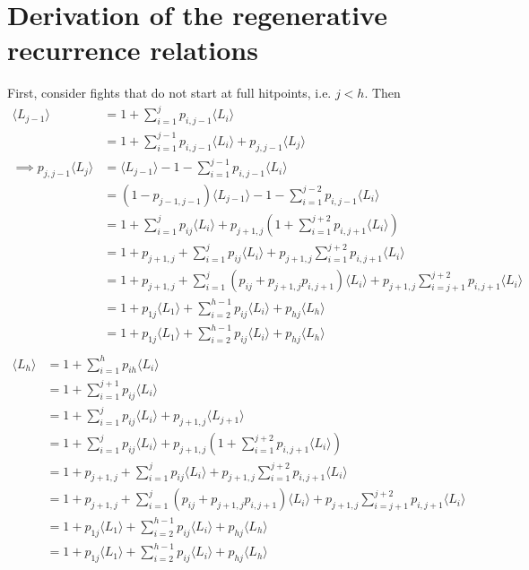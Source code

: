 \section{Derivation of the regenerative recurrence relations}\label{sect:regenRecurrenceDerivation}
First, consider fights that do not start at full hitpoints, i.e. $j < h$. Then
\begin{align}
	\langle L_{j-1} \rangle
		&= 1 + \sum_{i=1}^{j} p_{i,j-1}\langle L_i\rangle\nonumber\\
		&= 1 + \sum_{i=1}^{j-1} p_{i,j-1}\langle L_i\rangle + p_{j,j-1}\langle L_{j}\rangle\nonumber\\
	\implies p_{j,j-1}\langle L_{j}\rangle
		&= \langle L_{j-1} \rangle - 1 - \sum_{i=1}^{j-1} p_{i,j-1}\langle L_i\rangle\nonumber\\
		&= (1 - p_{j-1,j-1})\langle L_{j-1} \rangle - 1 - \sum_{i=1}^{j-2} p_{i,j-1}\langle L_i\rangle\nonumber\\
		&= 1 + \sum_{i=1}^{j} p_{ij}\langle L_i\rangle + p_{j+1,j}\left(1 + \sum_{i=1}^{j+2} p_{i,j+1}\langle L_i\rangle\right)\nonumber\\
		&= 1 + p_{j+1,j} + \sum_{i=1}^{j} p_{ij}\langle L_i\rangle + p_{j+1,j}\sum_{i=1}^{j+2} p_{i,j+1}\langle L_i\rangle\nonumber\\
		&= 1 + p_{j+1,j} + \sum_{i=1}^{j} \left(p_{ij} + p_{j+1,j}p_{i,j+1}\right)\langle L_i\rangle + p_{j+1,j}\sum_{i=j+1}^{j+2} p_{i,j+1}\langle L_i\rangle\nonumber\\
		&= 1 + p_{1j}\langle L_1 \rangle + \sum_{i=2}^{h-1} p_{ij}\langle L_i \rangle + p_{hj}\langle L_h\rangle\nonumber\\
		&= 1 + p_{1j}\langle L_1 \rangle + \sum_{i=2}^{h-1} p_{ij}\langle L_i \rangle + p_{hj}\langle L_h\rangle\nonumber\\
\end{align}
\begin{align}
    \langle L_h \rangle
		&= 1 + \sum_{i=1}^{h} p_{ih}\langle L_i\rangle\nonumber\\
		&= 1 + \sum_{i=1}^{j+1} p_{ij}\langle L_i\rangle\nonumber\\
		&= 1 + \sum_{i=1}^{j} p_{ij}\langle L_i\rangle + p_{j+1,j}\langle L_{j+1}\rangle\nonumber\\
		&= 1 + \sum_{i=1}^{j} p_{ij}\langle L_i\rangle + p_{j+1,j}\left(1 + \sum_{i=1}^{j+2} p_{i,j+1}\langle L_i\rangle\right)\nonumber\\
		&= 1 + p_{j+1,j} + \sum_{i=1}^{j} p_{ij}\langle L_i\rangle + p_{j+1,j}\sum_{i=1}^{j+2} p_{i,j+1}\langle L_i\rangle\nonumber\\
		&= 1 + p_{j+1,j} + \sum_{i=1}^{j} \left(p_{ij} + p_{j+1,j}p_{i,j+1}\right)\langle L_i\rangle + p_{j+1,j}\sum_{i=j+1}^{j+2} p_{i,j+1}\langle L_i\rangle\nonumber\\
		&= 1 + p_{1j}\langle L_1 \rangle + \sum_{i=2}^{h-1} p_{ij}\langle L_i \rangle + p_{hj}\langle L_h\rangle\nonumber\\
		&= 1 + p_{1j}\langle L_1 \rangle + \sum_{i=2}^{h-1} p_{ij}\langle L_i \rangle + p_{hj}\langle L_h\rangle\nonumber\\
\end{align}

